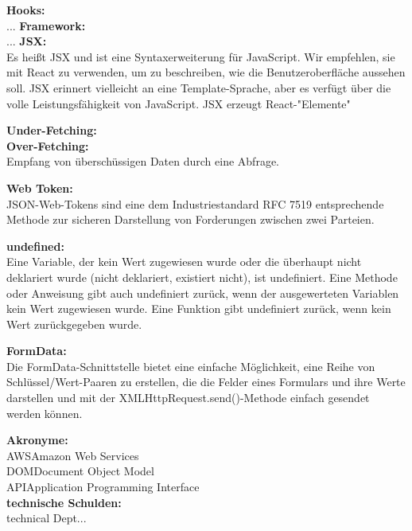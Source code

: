 

\textbf{Hooks:}\\
...
\textbf{Framework:}\\
...
\textbf{JSX:}\\
Es heißt JSX und ist eine Syntaxerweiterung für JavaScript. Wir empfehlen, sie mit React zu verwenden, um zu beschreiben, wie die Benutzeroberfläche aussehen soll. JSX erinnert vielleicht an eine Template-Sprache, aber es verfügt über die volle Leistungsfähigkeit von JavaScript. JSX erzeugt React-"Elemente"

\textbf{Under-Fetching:}\\

\textbf{Over-Fetching:}\\
Empfang von überschüssigen Daten durch eine Abfrage.

\textbf{Web Token:}\\
JSON-Web-Tokens sind eine dem Industriestandard RFC 7519 entsprechende Methode zur sicheren Darstellung von Forderungen zwischen zwei Parteien.

\textbf{undefined:}\\
Eine Variable, der kein Wert zugewiesen wurde oder die überhaupt nicht deklariert wurde (nicht deklariert, existiert nicht), ist undefiniert. Eine Methode oder Anweisung gibt auch undefiniert zurück, wenn der ausgewerteten Variablen kein Wert zugewiesen wurde. Eine Funktion gibt undefiniert zurück, wenn kein Wert zurückgegeben wurde.

\textbf{FormData:}\\
Die FormData-Schnittstelle bietet eine einfache Möglichkeit, eine Reihe von Schlüssel/Wert-Paaren zu erstellen, die die Felder eines Formulars und ihre Werte darstellen und mit der XMLHttpRequest.send()-Methode einfach gesendet werden können.

\textbf{Akronyme:}\\

{AWS}{Amazon Web Services}\\
{DOM}{Document Object Model}\\
{API}{Application Programming Interface}\\

\textbf{technische Schulden:}\\
technical Dept...

